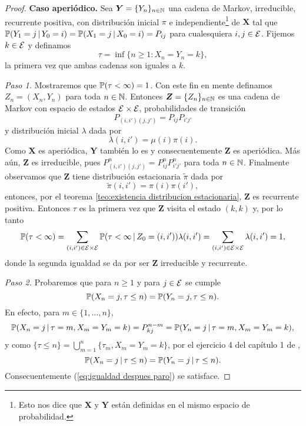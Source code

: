 \begin{proof}
    \textbf{Caso aperiódico.} Sea  $\bm Y = \{Y_n\}_{n \in \mathbb{N}}$ una cadena de Markov, irreducible, recurrente positiva, con distribución inicial $\pi$ e independiente\footnote{Esto nos dice que $\bm X$ y $\bm Y$ están definidas en el mismo espacio de probabilidad.} de $\bm X$ tal que $\mathbb{P}(Y_1 = j \,\vert\, Y_0 = i) = \mathbb{P}(X_1 = j \,\vert\, X_0 = i) = P_{ij}$ para cualesquiera $i,j \in \mathcal{E}$. Fijemos $k \in \mathcal{E}$ y definamos
    \[
        \tau = \inf\{n \geq 1 : X_n = Y_n = k\},    
    \]
    la primera vez que ambas cadenas son iguales a $k$.

    \emph{Paso 1.} Mostraremos que $\mathbb{P}(\tau < \infty) = 1$. Con este fin en mente definamos $Z_n = (X_n, Y_n)$ para toda $n \in \mathbb{N}$. Entonces $\bm Z = \{Z_n\}_{n \in \mathbb{N}}$ es una cadena de Markov con espacio de estados $\mathcal{E} \times \mathcal{E}$, probabilidades de transición
    \[
        P_{(i,i')(j,j')} = P_{ij} P_{i'j'}
    \] y distribución inicial $\lambda$ dada por 
    \[
        \lambda(i,i') = \mu(i) \pi(i).    
    \]
    Como $\bm X$ es aperiódica, $\bm Y$ también lo es y consecuentemente $\bm Z$ es aperiódica. Más aún, $\bm Z$ es irreducible, pues $P_{(i,i')(j,j')}^n = P_{ij}^n P_{i'j'}^n$ para toda $n \in \mathbb{N}$. Finalmente observamos que $\bm Z$ tiene distribución estacionaria $\tilde \pi$ dada por 
    \[
        \tilde \pi (i,i') = \pi(i) \pi(i'),
    \]
    entonces, por el teorema \ref{teo:existencia distribucion estacionaria}, $\bm Z$ es recurrente positiva. Entonces $\tau$ es la primera vez que $\bm Z$ visita el estado $(k,k)$ y, por lo tanto
    \[
        \mathbb{P}(\tau < \infty) = \sum_{(i,i') \in \mathcal{E} \times \mathcal{E}} \mathbb{P}(\tau < \infty \,\vert\, Z_0 = (i,i')) \lambda(i,i') = \sum_{(i,i') \in \mathcal{E} \times \mathcal{E}} \lambda(i,i') = 1,
    \]
    donde la segunda igualdad se da por ser $\bm Z$ irreducible y recurrente.

    \emph{Paso 2.} Probaremos que para $n \geq 1$ y para $j \in \mathcal{E}$ se cumple
    \begin{equation}
        \mathbb{P}(X_n = j, \tau \leq n) = \mathbb{P}(Y_n = j, \tau \leq n). \label{eq:igualdad despues paro}
    \end{equation}
    En efecto, para $m \in \{1, \ldots, n\}$, 
    \[
        \mathbb{P}(X_n = j \,\vert\, \tau = m, X_m = Y_m = k) = P_{kj}^{n-m} = \mathbb{P}(Y_n = j \,\vert\, \tau = m, X_m = Y_m = k),
    \]
    y como $\{\tau \leq n\} = \bigcup_{m = 1}^n \{\tau_m, X_m = Y_m = k\}$, por el ejercicio 4 del capítulo 1 de \cite{Hoel72},
    \[
        \mathbb{P}(X_n = j \,\vert\, \tau \leq n) =  \mathbb{P}(Y_n = j \,\vert\, \tau \leq n).
    \] Consecuentemente (\ref{eq:igualdad despues paro}) se satisface.
    

\end{proof}
